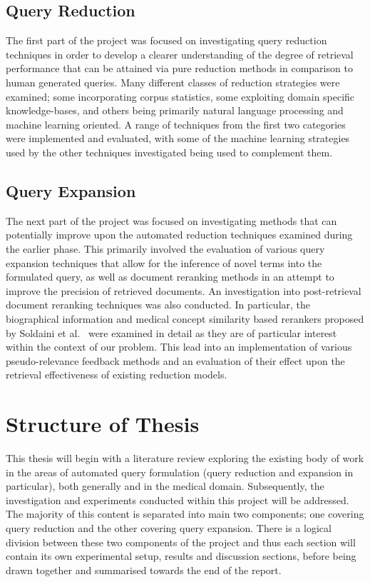 \documentclass[a4paper]{report}
\begin{document}
\subsection{Query Reduction}
The first part of the project was focused on investigating query reduction techniques in order to develop a clearer understanding of the degree of retrieval performance that can be attained via pure reduction methods in comparison to human generated queries. Many different classes of reduction strategies were examined; some incorporating corpus statistics, some exploiting domain specific knowledge-bases, and others being primarily natural language processing and machine learning oriented. A range of techniques from the first two categories were implemented and evaluated, with some of the machine learning strategies used by the other techniques investigated being used to complement them.

\subsection{Query Expansion}
The next part of the project was focused on investigating methods that can potentially improve upon the automated reduction techniques examined during the earlier phase. This primarily involved the evaluation of various query expansion techniques that allow for the inference of novel terms into the formulated query, as well as document reranking methods in an attempt to improve the precision of retrieved documents. An investigation into post-retrieval document reranking techniques was also conducted. In particular, the biographical information and medical concept similarity based rerankers proposed by Soldaini et al.~\cite{SoldainiPlaceholder} were examined in detail as they are of particular interest within the context of our problem. This lead into an implementation of various pseudo-relevance feedback methods and an evaluation of their effect upon the retrieval effectiveness of existing reduction models. 

\section{Structure of Thesis}
This thesis will begin with a literature review exploring the existing body of work in the areas of automated query formulation (query reduction and expansion in particular), both generally and in the medical domain. Subsequently, the investigation and experiments conducted within this project will be addressed. The majority of this content is separated into main two components; one covering query reduction and the other covering query expansion. There is a logical division between these two components of the project and thus each section will contain its own experimental setup, results and discussion sections, before being drawn together and summarised towards the end of the report.
\end{document}
